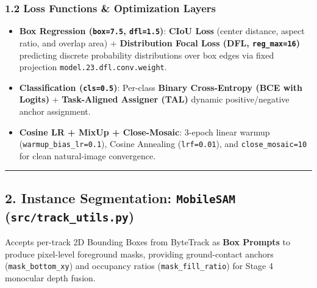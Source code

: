 \documentclass[10.5pt,a4paper]{article}
\begin{document}
\subsubsection{1.2 Loss Functions \& Optimization Layers}
\begin{itemize}[leftmargin=1.5em,itemsep=2pt]
\item \textbf{Box Regression (\texttt{box=7.\allowbreak{}5}, \texttt{dfl=1.\allowbreak{}5})}: \textbf{CIoU Loss} (center distance, aspect ratio, and overlap area) + \textbf{Distribution Focal Loss (DFL, \texttt{reg\_\allowbreak{}max=16})} predicting discrete probability distributions over box edges via fixed projection \texttt{model.\allowbreak{}23.\allowbreak{}dfl.\allowbreak{}conv.\allowbreak{}weight}.
\item \textbf{Classification (\texttt{cls=0.\allowbreak{}5})}: Per-class \textbf{Binary Cross-Entropy (BCE with Logits)} + \textbf{Task-Aligned Assigner (TAL)} dynamic positive/negative anchor assignment.
\item \textbf{Cosine LR + MixUp + Close-Mosaic}: 3-epoch linear warmup (\texttt{warmup\_\allowbreak{}bias\_\allowbreak{}lr=0.\allowbreak{}1}), Cosine Annealing (\texttt{lrf=0.\allowbreak{}01}), and \texttt{close\_\allowbreak{}mosaic=10} for clean natural-image convergence.
\end{itemize}

\par\noindent\rule{\textwidth}{0.4pt}\par\medskip

\subsection{2. Instance Segmentation: \texttt{MobileSAM} (\texttt{src/\allowbreak{}track\_\allowbreak{}utils.\allowbreak{}py})}

Accepts per-track 2D Bounding Boxes from ByteTrack as \textbf{Box Prompts} to produce pixel-level foreground masks, providing ground-contact anchors (\texttt{mask\_\allowbreak{}bottom\_\allowbreak{}xy}) and occupancy ratios (\texttt{mask\_\allowbreak{}fill\_\allowbreak{}ratio}) for Stage 4 monocular depth fusion.
\end{document}
